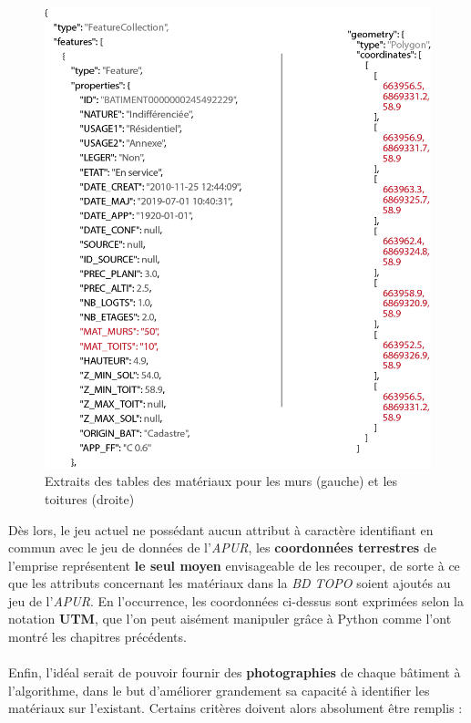 \documentclass[
  11pt,
  french,
]{article}
\begin{document}
\begin{tcolorbox}
\begin{figure}

{\centering \includegraphics[width=0.9\linewidth]{__imgs/donnee_ign} 

}

\caption[Extraits des tables des matériaux pour les murs (gauche) et les toitures (droite)  -  \url{http://piece-jointe-carto.developpement-durable.gouv.fr/NAT004/DTerNP/html3/annexes/}]{Extraits des tables des matériaux pour les murs (gauche) et les toitures (droite)}\label{fig:donnee_ign}
\end{figure}
\end{tcolorbox}

Dès lors, le jeu actuel ne possédant aucun attribut à caractère
identifiant en commun avec le jeu de données de l'\emph{APUR}, les
\textbf{coordonnées terrestres} de l'emprise représentent \textbf{le
seul moyen} envisageable de les recouper, de sorte à ce que les
attributs concernant les matériaux dans la \emph{BD TOPO} soient ajoutés
au jeu de l'\emph{APUR}. En l'occurrence, les coordonnées ci-dessus sont
exprimées selon la notation \textbf{UTM}, que l'on peut aisément
manipuler grâce à Python comme l'ont montré les chapitres précédents.\\
~\\
Enfin, l'idéal serait de pouvoir fournir des \textbf{photographies} de
chaque bâtiment à l'algorithme, dans le but d'améliorer grandement sa
capacité à identifier les matériaux sur l'existant. Certains critères
doivent alors absolument être remplis :
\end{document}
